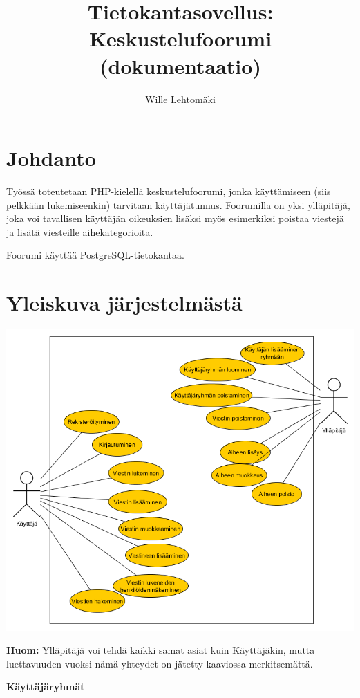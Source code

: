 \documentclass[12pt,a4paper,leqno]{report}
\title{Tietokantasovellus: Keskustelufoorumi (dokumentaatio)}
\author{Wille Lehtomäki}
\date{}
\begin{document}
\maketitle

\tableofcontents

\chapter{Johdanto}\label{johd}

Työssä toteutetaan PHP-kielellä keskustelufoorumi, jonka käyttämiseen (siis pelkkään lukemiseenkin) tarvitaan käyttäjätunnus. Foorumilla on yksi ylläpitäjä, joka voi tavallisen käyttäjän oikeuksien lisäksi myös esimerkiksi poistaa viestejä ja lisätä viesteille aihekategorioita.

Foorumi käyttää PostgreSQL-tietokantaa.

\chapter{Yleiskuva järjestelmästä}

\begin{center}
\includegraphics[scale=0.5]{kayttp}
\end{center}

\noindent \textbf{Huom:} Ylläpitäjä voi tehdä kaikki samat asiat kuin Käyttäjäkin, mutta luettavuuden vuoksi nämä yhteydet on jätetty kaaviossa merkitsemättä.

\Large\textbf{Käyttäjäryhmät}\normalsize\\
\end{document}
